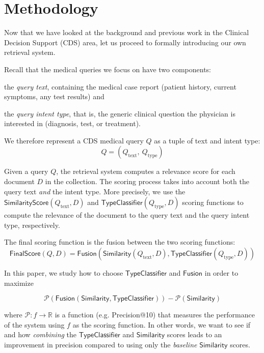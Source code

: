 \chapter{Methodology}

Now that we have looked at the background and previous work in the Clinical Decision Support (CDS) area,
let us proceed to formally introducing our own retrieval system. 

Recall that the medical queries we focus on have two components:
\begin{enumerate*}[label=\arabic*)]
 \item the \emph{query text}, containing the medical case report (patient history, current symptoms, any test results) and
 \item the \emph{query intent type}, that is, the generic clinical question the physician is interested in (diagnosis, test, or treatment).
\end{enumerate*}
We therefore represent a CDS medical query $Q$ as a tuple of text and intent type: \[Q = \left(Q_{\text{text}},\ Q_{\text{type}}\right)\]

Given a query $Q$, the retrieval system computes a relevance score for each document $D$ in the collection.
The scoring process takes into account both the query text \emph{and} the intent type. More precisely, we use the
$\textsf{SimilarityScore}(Q_{\text{text}}, D)$ and $\textsf{TypeClassifier}(Q_{\text{type}}, D)$ scoring functions to compute the relevance of the document to the query text and the
query intent type, respectively.

The final scoring function is the fusion between the two scoring functions:
\begin{equation}\label{fusion}
  \textsf{FinalScore}(Q, D) = \textsf{Fusion}\left(\textsf{Similarity}(Q_{\text{text}}, D), \textsf{TypeClassifier}(Q_{\text{type}}, D)\right)
\end{equation}

In this paper, we study how to choose $\textsf{TypeClassifier}$ and $\textsf{Fusion}$ in order to maximize

\[
 \mathcal{P}(\textsf{Fusion}(\textsf{Similarity}, \textsf{TypeClassifier})) - \mathcal{P}(\textsf{Similarity})
\]

where $\mathcal{P}: f \rightarrow \mathbb{R}$ is a function (e.g. Precision@10) that measures the performance of the system using $f$ 
as the scoring function. In other words, we want to see if and how \emph{combining} the $\textsf{TypeClassifier}$ and $\textsf{Similarity}$ 
scores leads to an improvement in precision compared to using only the \emph{baseline} $\textsf{Similarity}$ scores.


